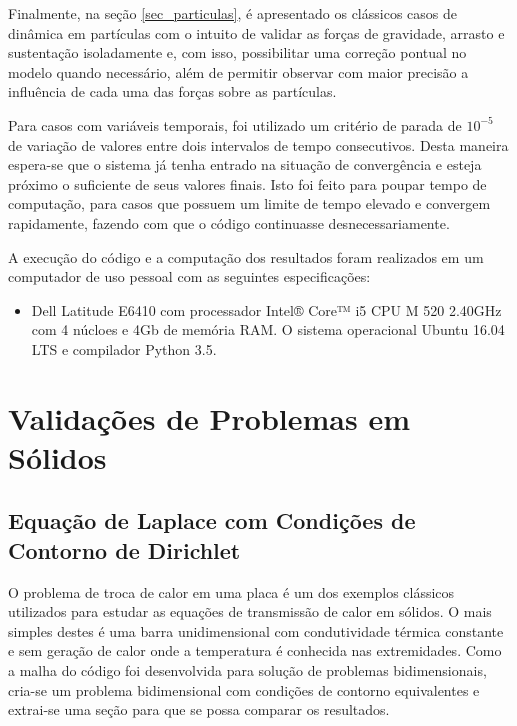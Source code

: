 Finalmente, na seção \ref{sec_particulas}, é apresentado os clássicos casos de dinâmica em partículas com o intuito de validar as forças de gravidade, arrasto e sustentação isoladamente e, com isso, possibilitar uma correção pontual no modelo quando
necessário, além de permitir observar com maior precisão a influência de cada uma das forças sobre as partículas.

Para casos com variáveis temporais, foi utilizado um critério de parada de $10^{-5}$ de variação de valores entre dois intervalos de tempo consecutivos.
Desta maneira espera-se que o sistema já tenha entrado na situação de convergência e esteja próximo o suficiente de seus valores finais.
Isto foi feito para poupar tempo de computação, para casos que possuem um limite de tempo elevado e convergem rapidamente, fazendo com que o código continuasse desnecessariamente.

A execução do código e a computação dos resultados foram realizados em um computador de uso pessoal com as seguintes especificações:
\begin{itemize}
    \item Dell Latitude E6410 com processador Intel® Core™ i5 CPU M 520 2.40GHz com 4 núcloes e 4Gb de memória RAM.
          O sistema operacional Ubuntu 16.04 LTS e compilador Python 3.5.
\end{itemize}


\section{\textbf{Validações de Problemas em Sólidos}}
\label{sec_solidos}
\subsection{\textbf{Equação de Laplace com Condições de Contorno de Dirichlet}}
\label{sec_laplace_dir}
O problema de troca de calor em uma placa é um dos exemplos clássicos utilizados para estudar as equações de transmissão de calor em sólidos. O mais simples destes é uma barra unidimensional com condutividade térmica constante e sem geração de calor onde a temperatura é conhecida nas extremidades.
Como a malha do código foi desenvolvida para solução de problemas bidimensionais, cria-se um problema bidimensional com condições de contorno equivalentes e extrai-se uma seção para que se possa comparar os resultados.

